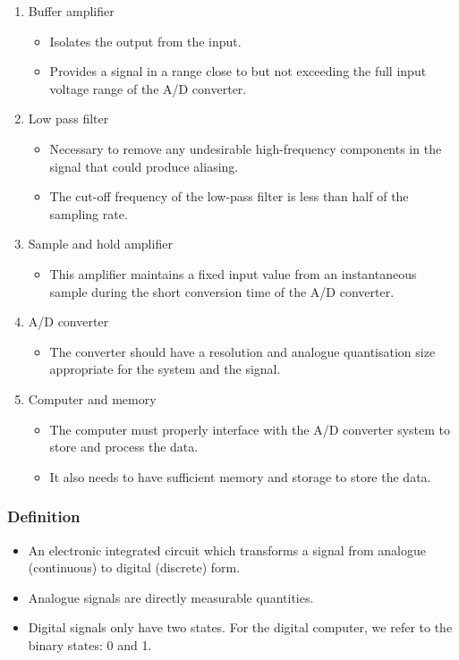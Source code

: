 \documentclass[11pt]{article}
\begin{document}
\begin{enumerate}
\item Buffer amplifier
\begin{itemize}
\item Isolates the output from the input.
\item Provides a signal in a range close to but not exceeding the full input voltage range of the A/D converter.
\end{itemize}
\item Low pass filter
\begin{itemize}
\item Necessary to remove any undesirable high-frequency components in the signal that could produce aliasing.
\item The cut-off frequency of the low-pass filter is less than half of the sampling rate.
\end{itemize}
\item Sample and hold amplifier
\begin{itemize}
\item This amplifier maintains a fixed input value from an instantaneous sample during the short conversion time of the A/D converter.
\end{itemize}
\item A/D converter
\begin{itemize}
\item The converter should have a resolution and analogue quantisation size appropriate for the system and the signal.
\end{itemize}
\item Computer and memory
\begin{itemize}
\item The computer must properly interface with the A/D converter system to store and process the data.
\item It also needs to have sufficient memory and storage to store the data.
\end{itemize}
\end{enumerate}
\subsubsection{Definition}
\label{sec:org8ee811a}
\begin{itemize}
\item An electronic integrated circuit which transforms a signal from analogue (continuous) to digital (discrete) form.
\item Analogue signals are directly measurable quantities.
\item Digital signals only have two states. For the digital computer, we refer to the binary states: 0 and 1.
\end{itemize}
\end{document}
